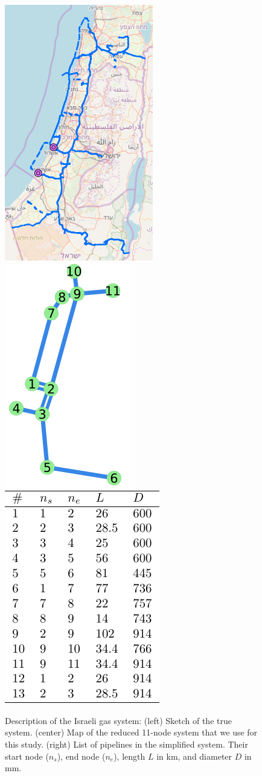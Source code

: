\begin{figure}
\includegraphics[width=0.33\linewidth, valign=t]{figs/fullModel.png}%
\includegraphics[width=0.33\linewidth, valign=t]{figs/reducedModel.png}%
\includegraphics[width=0.33\linewidth, valign=t]{figs/pipeDescription.pdf}
\caption{
Description of the Israeli gas system: (left) Sketch of the true system. (center) Map of the reduced 11-node system that we use for this study. (right) List of pipelines in the simplified system. Their start node ($n_s$), end node ($n_e$), length $L$ in km, and diameter $D$ in mm. %
\label{fig:map}
}
\end{figure}

